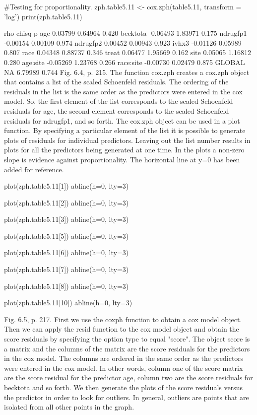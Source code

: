 #Testing for proportionality.
zph.table5.11 <- cox.zph(table5.11, transform = 'log')
print(zph.table5.11)

               rho   chisq     p 
      age  0.03799 0.64964 0.420
 becktota -0.06493 1.83971 0.175
 ndrugfp1 -0.00154 0.00109 0.974
 ndrugfp2  0.00452 0.00943 0.923
    ivhx3 -0.01126 0.05989 0.807
     race  0.04348 0.88737 0.346
    treat  0.06477 1.95669 0.162
     site  0.05065 1.16812 0.280
 age:site -0.05269 1.23768 0.266
race:site -0.00730 0.02479 0.875
   GLOBAL       NA 6.79989 0.744
Fig. 6.4, p. 215. 
The function cox.zph creates a cox.zph object that contains a list of the scaled Schoenfeld residuals.  The ordering of the residuals in the list is the same order as the predictors were entered in the cox model.  So, the first element of the list corresponds to the scaled Schoenfeld residuals for age, the second element corresponds to the scaled Schoenfeld residuals for ndrugfp1, and so forth. The cox.zph object can be used in a plot function.  By specifying a particular element of the list it is possible to generate plots of residuals for individual predictors.  Leaving out the list number results in plots for all the predictors being generated at one time.  In the plots a non-zero slope is evidence against proportionality. The horizontal line at y=0 has been added for reference.

plot(zph.table5.11[1])
abline(h=0, lty=3)

plot(zph.table5.11[2])
abline(h=0, lty=3)

plot(zph.table5.11[3])
abline(h=0, lty=3)

plot(zph.table5.11[5])
abline(h=0, lty=3)

plot(zph.table5.11[6])
abline(h=0, lty=3)

plot(zph.table5.11[7])
abline(h=0, lty=3)

plot(zph.table5.11[8])
abline(h=0, lty=3)

plot(zph.table5.11[10])
abline(h=0, lty=3)

Fig. 6.5, p. 217. 
First we use the coxph function to obtain a cox model object.  Then we can apply the resid function to the cox model object and obtain the score residuals by specifying the option type to equal "score". The object score is a matrix and the columns of the matrix are the score residuals for the predictors in the cox model.  The columns are ordered in the same order as the predictors were entered in the cox model.  In other words, column one of the score matrix are the score residual for the predictor age, column two are the score residuals for becktota and so forth.  We then generate the plots of the score residuals versus the predictor in order to look for outliers.  In general, outliers are points that are isolated from all other points in the graph.

